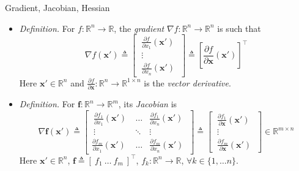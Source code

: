 \documentclass{beamer}
\numberwithin{equation}{section}
\begin{document}
\begin{frame}{Gradient, Jacobian, Hessian}
    \begin{itemize}
        \item
        \textit{Definition.} For $ f : \mathbb{R}^n \rightarrow \mathbb{R} $,
        the \textit{gradient} $ \nabla f : \mathbb{R}^n \rightarrow
        \mathbb{R}^n $ is such that
        \begin{equation*}
            \nabla f(\mathbf{x}') \triangleq \begin{bmatrix}
                \ \frac{\partial f}{\partial x_1}(\mathbf{x}') \ \\
                \ \vdots \ \\
                \ \frac{\partial f}{\partial x_n}(\mathbf{x}') \
            \end{bmatrix} \triangleq \left[
                \frac{\partial f}{\partial \mathbf{x}}(\mathbf{x}')
            \right]^\top
        \end{equation*}
        Here $ \mathbf{x}' \in \mathbb{R}^n $ and
        $ \frac{\partial f}{\partial \mathbf{x}} : \mathbb{R}^n \rightarrow
        \mathbb{R}^{1 \times n} $ is the \textit{vector
        derivative}\footnotemark{}.

        \item
        \textit{Definition.} For $ \mathbf{f} : \mathbb{R}^n \rightarrow
        \mathbb{R}^m $, its \textit{Jacobian} is
        \begin{equation*}
            \nabla\mathbf{f}(\mathbf{x}') \triangleq \begin{bmatrix}
                \ \frac{\partial f_1}{\partial x_1}(\mathbf{x}') \ & \ldots &
                    \frac{\partial f_1}{\partial x_n}(\mathbf{x}') \ \\
                \ \vdots & \ddots & \vdots \ \\
                \frac{\partial f_m}{\partial x_1}(\mathbf{x}') \ & \ldots &
                    \frac{\partial f_m}{\partial x_n}(\mathbf{x}') \
            \end{bmatrix} \triangleq \begin{bmatrix}
                \ \frac{\partial f_1}{\partial\mathbf{x}}(\mathbf{x}') \ \\
                \ \vdots \ \\
                \ \frac{\partial f_m}{\partial\mathbf{x}}(\mathbf{x}') \
            \end{bmatrix} \in \mathbb{R}^{m \times n}
        \end{equation*}
        Here $ \mathbf{x}' \in \mathbb{R}^n $, $ \mathbf{f} \triangleq
        [ \ f_1 \ \ldots \ f_ m \ ]^\top $, $ f_k : \mathbb{R}^n
        \rightarrow \mathbb{R} $, $ \forall k \in \{1, \ldots n\} $.
    \end{itemize}
    
    \bigskip
\end{frame}
\end{document}
